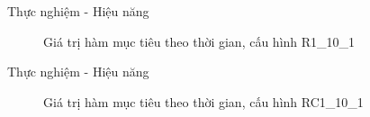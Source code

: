 \begin{frame}{Thực nghiệm - Hiệu năng}
  \begin{figure}
    \centering
    \quad
  \caption{Giá trị hàm mục tiêu theo thời gian, cấu hình R1\_10\_1}
  \end{figure}
\end{frame}

\begin{frame}{Thực nghiệm - Hiệu năng}
  \begin{figure}
    \centering
    \quad
  \caption{Giá trị hàm mục tiêu theo thời gian, cấu hình RC1\_10\_1}
  \end{figure}
\end{frame}

